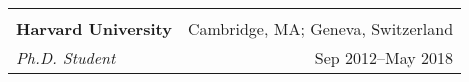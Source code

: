 \documentclass[letterpaper,11pt,oneside]{article}
\begin{document}
 \begin{flushleft}
 \vspace{-0.45cm}
 \begin{tabular}{@{} l r@{} }
    \hspace{0.6\linewidth} & \hspace{0.25\linewidth} \\
    \textbf{Harvard University} & \hspace{0.01\linewidth} Cambridge, MA; Geneva, Switzerland \\ 
    \textit{Ph.D. Student} & \hspace{0.175\linewidth} Sep 2012--May 2018 \\ 
 \end{tabular}
 \end{flushleft}
\end{document}
